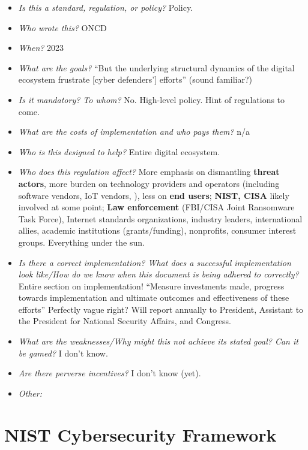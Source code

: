 \documentclass[11pt]{article}
\begin{document}
\begin{itemize}
    \item {\it Is this a standard, regulation, or policy?} Policy.
    \item {\it Who wrote this?} ONCD
    \item {\it When?} 2023
    \item {\it What are the goals?} ``But the underlying structural dynamics of the digital ecosystem frustrate [cyber defenders'] efforts'' (sound familiar?)
    \item {\it Is it mandatory? To whom?} No. High-level policy. Hint of regulations to come.
    \item {\it What are the costs of implementation and who pays them?} n/a
    \item {\it Who is this designed to help?} Entire digital ecosystem.
    \item {\it Who does this regulation affect?} More emphasis on dismantling {\bf threat actors}, more burden on {technology providers and operators} (including software vendors, IoT vendors, ), less on {\bf end users}; {\bf NIST, CISA} likely involved at some point; {\bf Law enforcement} (FBI/CISA Joint Ransomware Task Force), Internet standards organizations, industry leaders, international allies, academic institutions (grants/funding), nonprofits, consumer interest groups. Everything under the sun.
    \item {\it Is there a correct implementation? What does a successful implementation look like/How do we know when this document is being adhered to correctly?} Entire section on implementation! ``Measure investments made, progress towards implementation and ultimate outcomes and effectiveness of these efforts'' Perfectly vague right? Will report annually to President, Assistant to the President for National Security Affairs, and Congress. 
    \item {\it What are the weaknesses/Why might this not achieve its stated goal? Can it be gamed?} I don't know.
    \item {\it Are there perverse incentives?} I don't know (yet).
    \item {\it Other:}
\end{itemize}

\section{NIST Cybersecurity Framework}
\end{document}
